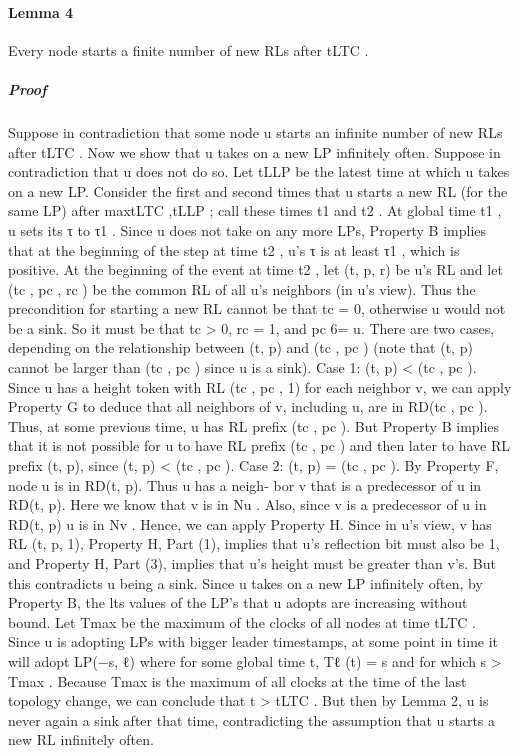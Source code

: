 \paragraph{Lemma 4} Every node starts a finite number of new RLs after tLTC .
\subparagraph{Proof} Suppose in contradiction that some node u starts an infinite number of new RLs after tLTC . Now we show that u takes on a new LP infinitely often. Suppose in contradiction that u does not do so. Let tLLP be the latest time at which u takes on a new LP. Consider the first and second times that u starts a new RL (for the same LP) after max{tLTC ,tLLP }; call these times t1 and t2 . At global time t1 , u sets its τ to τ1 . Since u does not take on any more LPs, Property B implies that at the beginning of the step at time t2 , u’s τ is at least τ1 , which is positive. At the beginning of the event at time t2 , let (t, p, r) be u’s RL and let (tc , pc , rc ) be the common RL of all u’s neighbors (in u’s view). Thus the precondition for starting a new RL cannot be that tc = 0, otherwise u would not be a sink. So it must be that tc > 0, rc = 1, and pc 6= u. There are two cases, depending on the relationship between (t, p) and (tc , pc ) (note that (t, p) cannot be larger than (tc , pc ) since u is a sink).
Case 1: (t, p) < (tc , pc ). Since u has a height token with RL (tc , pc , 1) for each neighbor v, we can apply Property G to deduce that all neighbors of v, including u, are in RD(tc , pc ). Thus, at some previous time, u has RL prefix (tc , pc ). But Property B implies that it is not possible for u to have RL prefix (tc , pc ) and then later to have RL prefix (t, p), since (t, p) < (tc , pc ). Case 2: (t, p) = (tc , pc ). By Property F, node u is in RD(t, p). Thus u has a neigh- bor v that is a predecessor of u in RD(t, p). Here we know that v is in Nu . Also, since v is a predecessor of u in RD(t, p) u is in Nv . Hence, we can apply Property H. Since in u’s view, v has RL (t, p, 1), Property H, Part (1), implies that u’s reflection bit must also be 1, and Property H, Part (3), implies that u’s height must be greater than v’s. But this contradicts u being a sink. Since u takes on a new LP infinitely often, by Property B, the lts values of the LP’s that u adopts are increasing without bound. Let Tmax be the maximum of the clocks of all nodes at time tLTC . Since u is adopting LPs with bigger leader timestamps, at some point in time it will adopt LP(−s, ℓ) where for some global time t, Tℓ (t) = s and for which s > Tmax . Because Tmax is the maximum of all clocks at the time of the last topology change, we can conclude that t > tLTC . But then by Lemma 2, u is never again a sink after that time, contradicting the assumption that u starts a new RL infinitely often.
